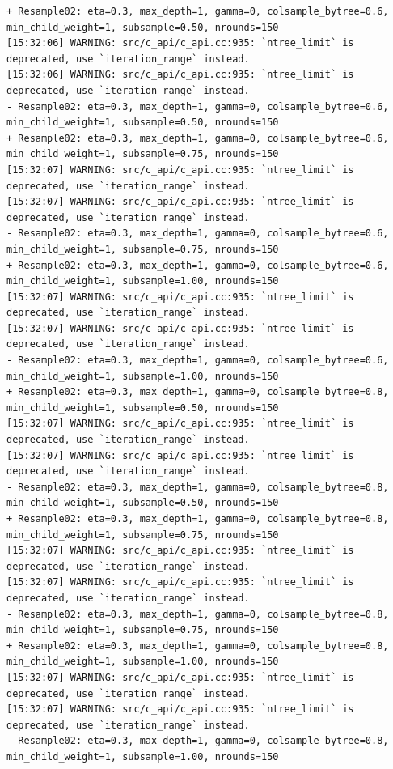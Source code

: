 \documentclass[
  letterpaper,
  DIV=11,
  numbers=noendperiod]{scrartcl}
\begin{document}
\begin{verbatim}
+ Resample02: eta=0.3, max_depth=1, gamma=0, colsample_bytree=0.6, min_child_weight=1, subsample=0.50, nrounds=150 
[15:32:06] WARNING: src/c_api/c_api.cc:935: `ntree_limit` is deprecated, use `iteration_range` instead.
[15:32:06] WARNING: src/c_api/c_api.cc:935: `ntree_limit` is deprecated, use `iteration_range` instead.
- Resample02: eta=0.3, max_depth=1, gamma=0, colsample_bytree=0.6, min_child_weight=1, subsample=0.50, nrounds=150 
+ Resample02: eta=0.3, max_depth=1, gamma=0, colsample_bytree=0.6, min_child_weight=1, subsample=0.75, nrounds=150 
[15:32:07] WARNING: src/c_api/c_api.cc:935: `ntree_limit` is deprecated, use `iteration_range` instead.
[15:32:07] WARNING: src/c_api/c_api.cc:935: `ntree_limit` is deprecated, use `iteration_range` instead.
- Resample02: eta=0.3, max_depth=1, gamma=0, colsample_bytree=0.6, min_child_weight=1, subsample=0.75, nrounds=150 
+ Resample02: eta=0.3, max_depth=1, gamma=0, colsample_bytree=0.6, min_child_weight=1, subsample=1.00, nrounds=150 
[15:32:07] WARNING: src/c_api/c_api.cc:935: `ntree_limit` is deprecated, use `iteration_range` instead.
[15:32:07] WARNING: src/c_api/c_api.cc:935: `ntree_limit` is deprecated, use `iteration_range` instead.
- Resample02: eta=0.3, max_depth=1, gamma=0, colsample_bytree=0.6, min_child_weight=1, subsample=1.00, nrounds=150 
+ Resample02: eta=0.3, max_depth=1, gamma=0, colsample_bytree=0.8, min_child_weight=1, subsample=0.50, nrounds=150 
[15:32:07] WARNING: src/c_api/c_api.cc:935: `ntree_limit` is deprecated, use `iteration_range` instead.
[15:32:07] WARNING: src/c_api/c_api.cc:935: `ntree_limit` is deprecated, use `iteration_range` instead.
- Resample02: eta=0.3, max_depth=1, gamma=0, colsample_bytree=0.8, min_child_weight=1, subsample=0.50, nrounds=150 
+ Resample02: eta=0.3, max_depth=1, gamma=0, colsample_bytree=0.8, min_child_weight=1, subsample=0.75, nrounds=150 
[15:32:07] WARNING: src/c_api/c_api.cc:935: `ntree_limit` is deprecated, use `iteration_range` instead.
[15:32:07] WARNING: src/c_api/c_api.cc:935: `ntree_limit` is deprecated, use `iteration_range` instead.
- Resample02: eta=0.3, max_depth=1, gamma=0, colsample_bytree=0.8, min_child_weight=1, subsample=0.75, nrounds=150 
+ Resample02: eta=0.3, max_depth=1, gamma=0, colsample_bytree=0.8, min_child_weight=1, subsample=1.00, nrounds=150 
[15:32:07] WARNING: src/c_api/c_api.cc:935: `ntree_limit` is deprecated, use `iteration_range` instead.
[15:32:07] WARNING: src/c_api/c_api.cc:935: `ntree_limit` is deprecated, use `iteration_range` instead.
- Resample02: eta=0.3, max_depth=1, gamma=0, colsample_bytree=0.8, min_child_weight=1, subsample=1.00, nrounds=150 

\end{verbatim}
\end{document}

